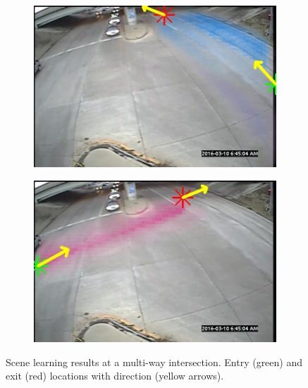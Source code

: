 \begin{figure}
\begin{subfigure}{0.32\linewidth}
        \end{subfigure}
        \begin{subfigure}{0.32\linewidth}
            \includegraphics[width=\linewidth]{./img/scene_learning/res/middle/middle-2.jpg}
        \end{subfigure}
        \begin{subfigure}{0.32\linewidth}
            \includegraphics[width=\linewidth]{./img/scene_learning/res/middle/middle-4.jpg}
        \end{subfigure}
        \caption{Scene learning results at a multi-way intersection. Entry (green) and exit (red) locations with direction (yellow arrows).}
        \label{fig:entry-exit-full-2}
\end{figure}

